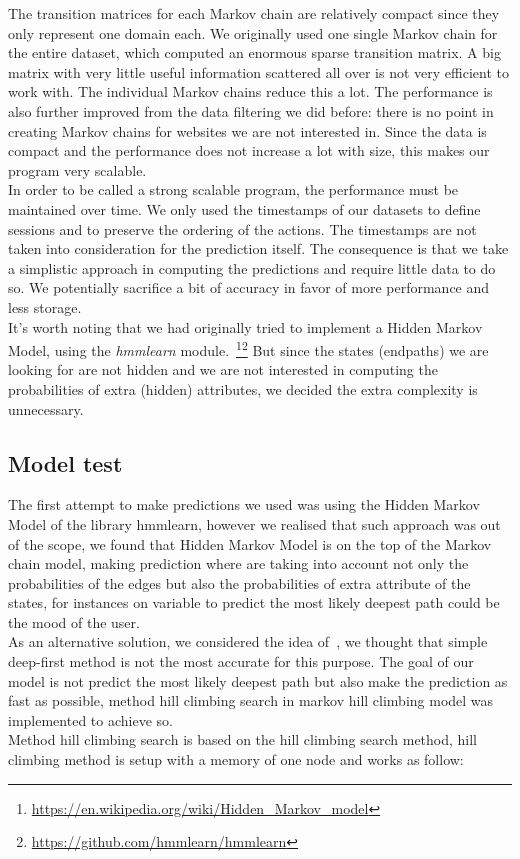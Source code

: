 The transition matrices for each Markov chain are relatively compact since they only represent one domain each. We originally used one single Markov chain for the entire dataset, which computed an enormous sparse transition matrix. A big matrix with very little useful information scattered all over is not very efficient to work with. The individual Markov chains reduce this a lot. The performance is also further improved from the data filtering we did before: there is no point in creating Markov chains for websites we are not interested in. Since the data is compact and the performance does not increase a lot with size, this makes our program very scalable.
\\[2ex]
In order to be called a strong scalable program, the performance must be maintained over time. We only used the timestamps of our datasets to define sessions and to preserve the ordering of the actions. The timestamps are not taken into consideration for the prediction itself. The consequence is that we take a simplistic approach in computing the predictions and require little data to do so. We potentially sacrifice a bit of accuracy in favor of more performance and less storage.
\\[2ex]
It's worth noting that we had originally tried to implement a Hidden Markov Model, using the \textit{hmmlearn} module.~\footnote{\url{https://en.wikipedia.org/wiki/Hidden_Markov_model}}\footnote{\url{https://github.com/hmmlearn/hmmlearn}} But since the states (endpaths) we are looking for are not hidden and we are not interested in computing the probabilities of extra (hidden) attributes, we decided the extra complexity is unnecessary.

\subsection{Model test}\label{subsec:model_test}

The first attempt to make predictions we used was using the Hidden Markov Model of the library hmmlearn, however we realised that such approach was out of the scope, we found that Hidden Markov Model is on the top of the Markov chain model, making prediction where are taking into account not only the probabilities of the edges but also the probabilities of extra attribute of the states, for instances on variable to predict the most likely deepest path could be the mood of the user.
\\[2ex]
As an alternative solution, we considered the idea of~\cite{article:markovmodel}, we thought that simple deep-first method is not the most accurate for this purpose. The goal of our model is not predict the most likely deepest path but also make the prediction as fast as possible, method hill climbing search in markov hill climbing model was implemented to achieve so.
\\[2ex]
Method hill climbing search is based  on the hill climbing search method, hill climbing method is setup with a memory of one node and works as follow:

